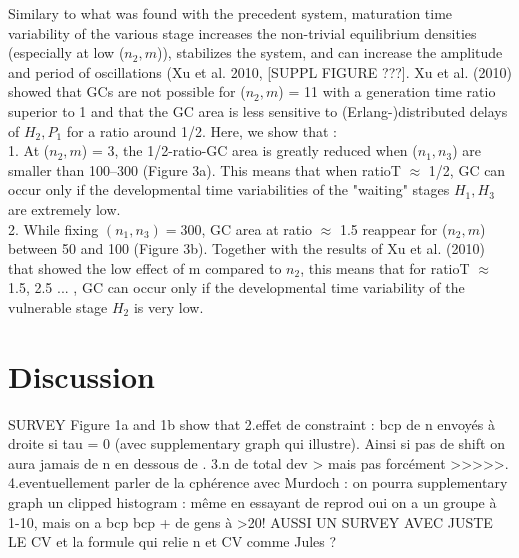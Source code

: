 \documentclass[12pt,a4paper,onecolumn]{article}
\begin{document}
\tabto{1 cm} Similary to what was found with the precedent system, maturation time variability of the various stage increases the non-trivial equilibrium densities (especially at low ($n_2, m$)), stabilizes the system, and can increase the amplitude and period of oscillations (Xu et al. 2010, [SUPPL FIGURE ???]. 
\tabto{1 cm} Xu et al. (2010) showed that GCs are not possible for ($n_2,m$) = 11 with a generation time ratio superior to 1 and that the GC area is less sensitive to (Erlang-)distributed delays of $H_2, P_1$ for a ratio around 1/2. Here, we show that : \\
\tabto{1.5 cm} 1. At ($n_2,m$) = 3, the 1/2-ratio-GC area is greatly reduced when ($n_1, n_3$) are smaller than 100--300 (Figure 3a). This means that when ratioT $\approx$ 1/2, GC can occur only if the developmental time variabilities of the "waiting" stages $H_1, H_3$ are extremely low. \\
\tabto{1.5 cm} 2. While fixing $(n_1, n_3) = 300$, GC area at ratio $\approx$ 1.5 reappear for ($n_2,m$) between 50 and 100 (Figure 3b). Together with the results of Xu et al. (2010) that showed the low effect of m compared to $n_2$, this means that for ratioT $\approx$ 1.5, 2.5 ... , GC can occur only if the developmental time variability of the vulnerable stage $H_2$ is very low. \\
























\section{Discussion}

SURVEY
Figure 1a and 1b show that 
	2.effet de constraint : bcp de n envoyés à droite si tau = 0 (avec supplementary graph qui illustre). Ainsi si pas de shift on aura jamais de n en dessous de . 
	3.n de total dev > mais pas forcément >>>>>.
	4.eventuellement parler de la cphérence avec Murdoch : on pourra supplementary graph un clipped histogram : même en essayant de reprod oui on a un groupe à 1-10, mais on a bcp bcp + de gens à >20!
AUSSI UN SURVEY AVEC JUSTE LE CV et la formule qui relie n et CV comme Jules ? 
\end{document}
